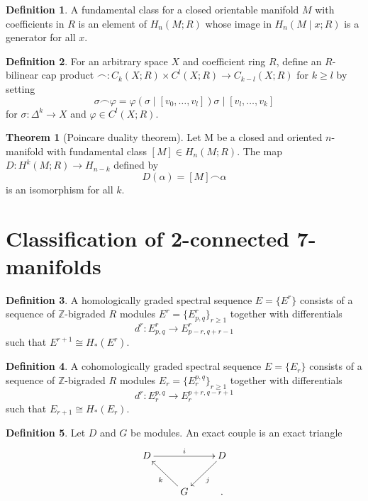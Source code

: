\documentclass[A4,11pt,oneside]{book}
\theoremstyle{definition}
\newtheorem{teo}{Theorem}
\newtheorem{defi}{Definition}
\begin{document}
\begin{defi}
A fundamental class for a closed orientable manifold $M$ with coefficients in $R$ is an element of $H_n(M;R)$ whose image in $H_n(M\mid x;R)$ is a generator for all $x$.
\end{defi}
\begin{defi}
For an arbitrary space $X$ and coefficient ring $R$, define an $R$-bilinear cap product $\frown:C_k(X;R)\times C^l(X;R)\rightarrow C_{k-l}(X;R)$ for $k\geq l$ by setting
\begin{equation*}
\sigma\frown\varphi=\varphi(\sigma\mid[v_0,\dots,v_l])\sigma\mid[v_l,\dots,v_k]
\end{equation*}
for $\sigma:\Delta^k\rightarrow X$ and $\varphi\in C^l(X;R).$  
\end{defi}
\begin{teo}[Poincare duality theorem]
Let M be a closed and oriented $n$-manifold with fundamental class $[M]\in H_n(M;R)$. The map $D:H^k(M;R)\rightarrow H_{n-k}$ defined by
 \begin{equation*}
 D(\alpha)=[M]\frown\alpha
\end{equation*}
is an isomorphism for all $k$.
\end{teo}

\section{Classification of 2-connected 7-manifolds}

\begin{defi}
A homologically graded spectral sequence $E=\{E^r\}$ consists of a sequence of $\mathbb{Z}$-bigraded $R$ modules $E^r=\{E^r_{p,q}\}_{r\geq1}$ together with differentials 
\begin{equation*}
d^r:E^r_{p,q}\rightarrow E^r_{p-r,q+r-1}
\end{equation*}
such that $E^{r+1}\cong H_*(E^r)$. 
\end{defi}

\begin{defi}
A cohomologically graded spectral sequence $E=\{E_r\}$ consists of a sequence of $\mathbb{Z}$-bigraded $R$ modules $E_r=\{E_r^{p,q}\}_{r\geq1}$ together with differentials 
\begin{equation*}
d^r:E_r^{p,q}\rightarrow E_r^{p+r,q-r+1}
\end{equation*}
such that $E_{r+1}\cong H_*(E_r)$. 
\end{defi}

\begin{defi}
Let $D$ and $G$ be modules. An exact couple is an exact triangle
\begin{displaymath}
\xymatrix{ 
D \ar[rr]^i& &D\ar[ld]^{j} \\
 & G\ar[lu]^k &.
}
\end{displaymath}
\end{defi}
\end{document}
